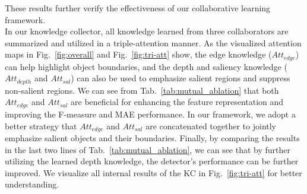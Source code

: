 \documentclass[runningheads]{llncs}
\begin{document}
These results further verify the effectiveness of our collaborative learning framework.
\\
In our knowledge collector, all knowledge learned from three collaborators are summarized and utilized in a triple-attention manner.
As the visualized attention maps in Fig.~\ref{fig:overall} and Fig.~\ref{fig:tri-att} show, the edge knowledge ($Att_{edge}$) can help highlight object boundaries, and the depth and saliency knowledge ($Att_{depth}$ and $Att_{sal}$) can also be used to emphasize salient regions and suppress non-salient regions.
We can see from Tab.~\ref{tab:mutual_ablation} that both $Att_{edge}$ and $Att_{sal}$ are beneficial for enhancing the feature representation and improving the F-measure and MAE performance.
In our framework, we adopt a better strategy that $Att_{edge}$ and $Att_{sal}$ are concatenated together to jointly emphasize salient objects and their boundaries.
Finally, by comparing the results in the last two lines of Tab.~\ref{tab:mutual_ablation}, we can see that by further utilizing the learned depth knowledge, the detector's performance can be further improved.
We visualize all internal results of the KC in Fig.~\ref{fig:tri-att} for better understanding.
\end{document}
